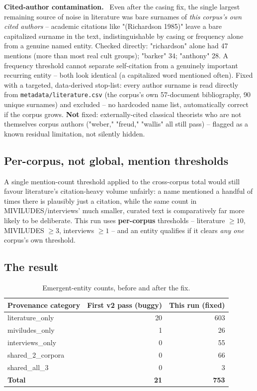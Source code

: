 \documentclass[11pt,a4paper]{article}
\newenvironment{fixbox}[1][What was fixed]
  {\par\vspace{6pt}\noindent{\color{fixline}\rule{\linewidth}{0.8pt}}\par\vspace{3pt}
   \noindent\small\textcolor{fixline}{\textbf{#1.}}\ \ignorespaces}
  {\par\vspace{3pt}\noindent{\color{fixline}\rule{\linewidth}{0.8pt}}\vspace{6pt}\par}
\begin{document}
\begin{fixbox}[Cited-author contamination]
Even after the casing fix, the single largest remaining source of noise
in literature was bare surnames of \emph{this corpus's own cited
authors} -- academic citations like "(Richardson 1985)" leave a bare
capitalized surname in the text, indistinguishable by casing or frequency
alone from a genuine named entity. Checked directly: "richardson" alone
had 47 mentions (more than most real cult groups); "barker" 34;
"anthony" 28. A frequency threshold cannot separate self-citation from a
genuinely important recurring entity -- both look identical (a
capitalized word mentioned often). Fixed with a targeted, data-derived
stop-list: every author surname is read directly from
\texttt{metadata/literature.csv} (the corpus's own 57-document
bibliography, 90 unique surnames) and excluded -- no hardcoded name
list, automatically correct if the corpus grows. \textbf{Not} fixed:
externally-cited classical theorists who are not themselves corpus
authors ("weber," "freud," "wallis" all still pass) -- flagged as a
known residual limitation, not silently hidden.
\end{fixbox}

\subsection{Per-corpus, not global, mention thresholds}

A single mention-count threshold applied to the cross-corpus total would
still favour literature's citation-heavy volume unfairly: a name
mentioned a handful of times there is plausibly just a citation, while
the same count in MIVILUDES/interviews' much smaller, curated text is
comparatively far more likely to be deliberate. This run uses
\textbf{per-corpus} thresholds -- literature $\geq 10$, MIVILUDES $\geq 3$,
interviews $\geq 1$ -- and an entity qualifies if it clears \emph{any
one} corpus's own threshold.

\subsection{The result}

\begin{table}[h!]
\centering
\begin{tabular}{lrr}
\toprule
Provenance category & First v2 pass (buggy) & This run (fixed) \\
\midrule
literature\_only & 20 & 603 \\
miviludes\_only & 1 & 26 \\
interviews\_only & 0 & 55 \\
shared\_2\_corpora & 0 & 66 \\
shared\_all\_3 & 0 & 3 \\
\midrule
\textbf{Total} & \textbf{21} & \textbf{753} \\
\bottomrule
\end{tabular}
\caption{Emergent-entity counts, before and after the fix.}
\end{table}
\end{document}
